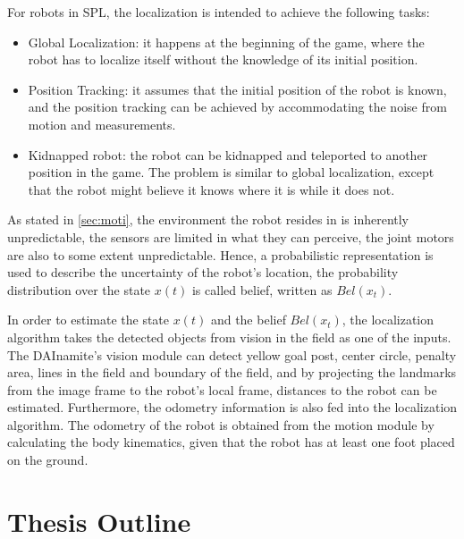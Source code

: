 For robots in \gls{SPL}, the localization is intended to achieve the following tasks:
\begin{itemize}
  \item Global Localization: it happens at the beginning of the game, where the robot has to localize itself without the knowledge of its initial position.
  \item Position Tracking: it assumes that the initial position of the robot is known, and the position tracking can be achieved by accommodating the noise from motion and measurements.
  \item Kidnapped robot: the robot can be kidnapped and teleported to another position in the game. The problem is similar to global localization, except that the robot might believe it knows where it is while it does not.
\end{itemize}
As stated in \autoref{sec:moti}, the environment the robot resides in is inherently unpredictable, the sensors are limited in what they can perceive, the joint motors are also to some extent unpredictable. Hence, a probabilistic representation is used to describe the uncertainty of the robot's location, the probability distribution over the state $x(t)$ is called belief, written as $Bel(x_{t})$.

In order to estimate the state $x(t)$ and the belief $Bel(x_{t})$, the localization algorithm takes the detected objects from vision in the field as one of the inputs. The DAInamite's vision module can detect yellow goal post, center circle, penalty area, lines in the field and boundary of the field, and by projecting the landmarks from the image frame to the robot's local frame, distances to the robot can be estimated. Furthermore, the odometry information is also fed into the localization algorithm. The odometry of the robot is obtained from the motion module by calculating the body kinematics, given that the robot has at least one foot placed on the ground.
\section{Thesis Outline\label{sec:outline}}

